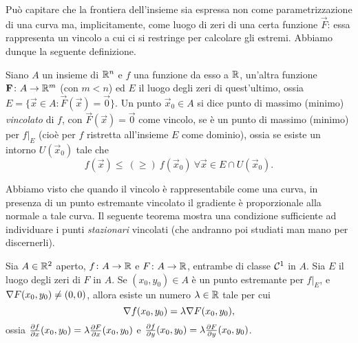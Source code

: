 Può capitare che la frontiera dell'insieme sia espressa non come parametrizzazione di una curva ma, implicitamente, come luogo di zeri di una certa funzione $\vec F$: essa rappresenta un vincolo a cui ci si restringe per calcolare gli estremi.
Abbiamo dunque la seguente definizione.
\begin{definizione} \label{d:estremi-vincolati}
	Siano $A$ un insieme di $\mathbb{R}^n$ e $f$ una funzione da esso a $\mathbb{R}$, un'altra funzione $\mathbf{F}\colon A\to\mathbb{R}^m$ (con $m<n$) ed $E$ il luogo degli zeri di quest'ultimo, ossia $E=\{\vec x\in A\colon \vec F(\vec x)=\vec 0\}$.
	Un punto $\vec x_0\in A$ si dice punto di massimo (minimo) \emph{vincolato} di $f$, con $\vec F(\vec x)=\vec 0$ come vincolo, se è un punto di massimo (minimo) per $f|_E$ (cioè per $f$ ristretta all'insieme $E$ come dominio), ossia se esiste un intorno $U(\vec x_0)$ tale che
	\begin{equation*}
		f(\vec x)\leq\ (\geq)\ f(\vec x_0)\ \forall\vec x\in E\cap U(\vec x_0).
	\end{equation*}
\end{definizione}
Abbiamo visto che quando il vincolo è rappresentabile come una curva, in presenza di un punto estremante vincolato il gradiente è proporzionale alla normale a tale curva.
Il seguente teorema mostra una condizione sufficiente ad individuare i punti \emph{stazionari} vincolati (che andranno poi studiati man mano per discernerli).
\begin{teorema} \label{t:moltiplicatori-lagrange-R2}
	Sia $A\in\mathbb{R}^2$ aperto, $f\colon A\to\mathbb{R}$ e $F\colon A\to\mathbb{R}$, entrambe di classe $\mathcal{C}^{{1}}$ in $A$. Sia $E$ il luogo degli zeri di $F$ in $A$. Se $(x_0,y_0)\in A$ è un punto estremante per $f|_E$, e $\nabla F(x_0,y_0)\neq(0,0)$, allora esiste un numero $\lambda\in\mathbb{R}$ tale per cui
	\begin{equation} 
		\nabla f(x_0,y_0)=\lambda\nabla F(x_0,y_0),
		\label{eq:moltiplicatori-lagrange-R2}
	\end{equation}
	ossia $\frac{\partial {f}}{\partial {x}}(x_0,y_0)=\lambda\frac{\partial {F}}{\partial {x}}(x_0,y_0)$ e $\frac{\partial {f}}{\partial {y}}(x_0,y_0)=\lambda\frac{\partial {F}}{\partial {y}}(x_0,y_0)$.
\end{teorema}

